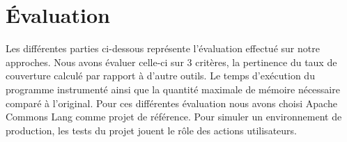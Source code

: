 \chapter{Évaluation}
	\thispagestyle{document}

Les différentes parties ci-dessous représente l'évaluation effectué sur notre approches. Nous avons évaluer celle-ci sur 3 critères, la pertinence du taux de couverture calculé par rapport à d'autre outils. Le temps d'exécution du programme instrumenté ainsi que la quantité maximale de mémoire nécessaire comparé à l'original. Pour ces différentes évaluation nous avons choisi Apache Commons Lang comme projet de référence. Pour simuler un environnement de production, les tests du projet jouent le rôle des actions utilisateurs.
	
		
		
		